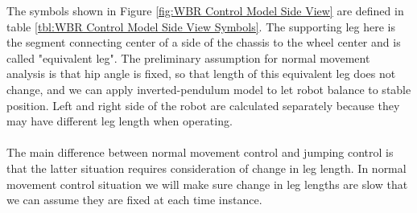 \documentclass[12pt]{article}
\begin{document}
            The symbols shown in Figure \ref{fig:WBR Control Model Side View} are defined in table \ref{tbl:WBR Control Model Side View Symbols}. The supporting leg here is the segment connecting center of a side of the chassis to the wheel center and is called "equivalent leg". The preliminary assumption for normal movement analysis is that hip angle is fixed, so that length of this equivalent leg does not change, and we can apply inverted-pendulum model to let robot balance to stable position. Left and right side of the robot are calculated separately because they may have different leg length when operating.\\\\
            The main difference between normal movement control and jumping control is that the latter situation requires consideration of change in leg length. In normal movement control situation we will make sure change in leg lengths are slow that we can assume they are fixed at each time instance.
            
\end{document}
